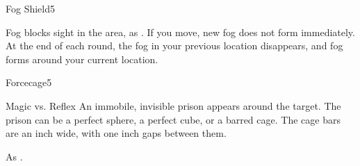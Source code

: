 \begin{spellsection}{Fog Shield}{5}
    \begin{spellheader}
    \end{spellheader}
    \begin{spellcontent}
        \begin{spelltargetinginfo}
        \end{spelltargetinginfo}
        \begin{spelleffects}
            \spelleffect Fog blocks sight in the area, as . If you move, new fog does not form immediately. At the end of each round, the fog in your previous location disappears, and fog forms around your current location.
            \spelldur \durshort
        \end{spelleffects}
    \end{spellcontent}
    \begin{spellfooter}
        \spellnotes \fogspellnotes \fogwindspellnotes
        \miscastexplode
    \end{spellfooter}
\end{spellsection}

\begin{spellsection}{Forcecage}{5}
    \begin{spellheader}
    \end{spellheader}
    \begin{spellcontent}
        \begin{spelltargetinginfo}
        \end{spelltargetinginfo}
        \begin{spelleffects}
            \begin{spellattack}{Magic vs. Reflex}
                \spellsuccess An immobile, invisible prison appears around the target. The prison can be a perfect sphere, a perfect cube, or a barred cage. The cage bars are an inch wide, with one inch gaps between them.
            \end{spellattack}
            \spelldur \durshort \dismissable
        \end{spelleffects}
    \end{spellcontent}
    \begin{spellfooter}
        \spellnotes As .
        \miscastrandom
    \end{spellfooter}
\end{spellsection}

